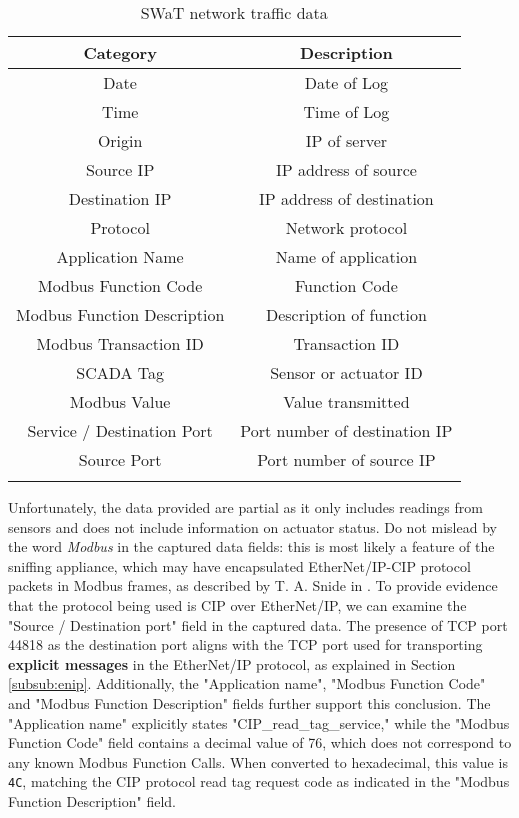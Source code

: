 \begin{longtable}[c]{| c | c |}
	\hline
	\textbf{Category} & \textbf{Description} \\ [0.5ex] 
	\hline
	Date & Date of Log \\
	\hline 
	Time & Time of Log \\
	\hline
	Origin & IP of server \\
	\hline 
	Source IP & IP address of source \\ 
	\hline
	Destination IP & IP address of destination \\ 
	\hline
	Protocol & Network protocol \\ 
	\hline
	Application Name & Name of application \\ 
	\hline
	Modbus Function Code & Function Code \\ 
	\hline
	Modbus Function Description & Description of function \\ 
	\hline
	Modbus Transaction ID & Transaction ID \\ 
	\hline
	SCADA Tag & Sensor or actuator ID \\ 
	\hline
	Modbus Value & Value transmitted \\ 
	\hline
	Service / Destination Port & Port number of destination IP \\ 
	\hline
	Source Port & Port number of source IP \\ 
	\hline
	
	\caption{SWaT network traffic data}
	\label{table:5_swat_network_traffic_data}
\end{longtable}
Unfortunately, the data provided are partial as it only includes readings from sensors and does not include information on actuator status.\newline \newline
Do not mislead by the word \textit{Modbus} in the captured data fields: this is most likely a feature of the sniffing appliance, which may have encapsulated EtherNet/IP-CIP protocol packets in Modbus frames, as described by T. A. Snide in \cite{cip_in_modbus}.\newline
To provide evidence that the protocol being used is CIP over EtherNet/IP, we can examine the "Source / Destination port" field in the captured data. The presence of TCP port 44818 as the destination port aligns with the TCP port used for transporting \textbf{explicit messages} in the EtherNet/IP protocol, as explained in Section \ref{subsub:enip}. Additionally, the "Application name", "Modbus Function Code" and "Modbus Function Description" fields further support this conclusion. The "Application name" explicitly states "CIP\_read\_tag\_service," while the "Modbus Function Code" field contains a decimal value of 76, which does not correspond to any known Modbus Function Calls. When converted to hexadecimal, this value is \texttt{4C}, matching the CIP protocol read tag request code as indicated in the "Modbus Function Description" field.

